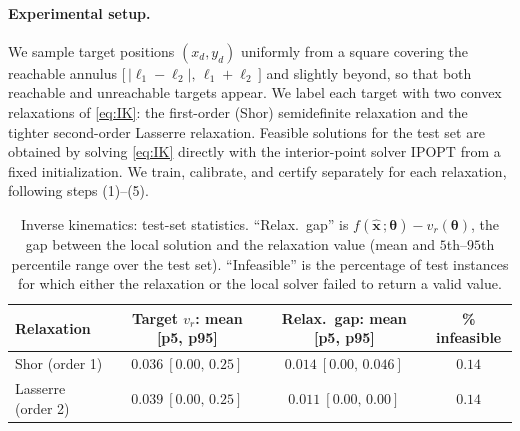 \documentclass[10pt]{article} %
\theoremstyle{plain}
\theoremstyle{definition}
\theoremstyle{remark}
\begin{document}
\paragraph{Experimental setup.} We sample target positions $(x_d, y_d)$ uniformly from a square covering the reachable annulus $\big[\,|\ell_1 - \ell_2|,\, \ell_1 + \ell_2\,\big]$ and slightly beyond, so that both reachable and unreachable targets appear. We label each target with two convex relaxations of \eqref{eq:IK}: the first-order (Shor) semidefinite relaxation and the tighter second-order Lasserre relaxation. Feasible solutions for the test set are obtained by solving \eqref{eq:IK} directly with the interior-point solver IPOPT from a fixed initialization. We train, calibrate, and certify separately for each relaxation, following steps (1)--(5).

\begin{table}[H]
\centering
\caption{Inverse kinematics: test-set statistics. ``Relax.\ gap'' is $f(\hat{\mathbf{x}}\,;\bm{\theta}) - v_r(\bm{\theta})$, the gap between the local solution and the relaxation value (mean and $5$th--$95$th percentile range over the test set). ``Infeasible'' is the percentage of test instances for which either the relaxation or the local solver failed to return a valid value.}
\begin{tabular}{lccc}
\toprule
\textbf{Relaxation} & \textbf{Target } $v_r$\textbf{: mean [p5, p95]} & \textbf{Relax.\ gap: mean [p5, p95]} & \textbf{\% infeasible} \\
\midrule
Shor (order 1)     & $0.036\ [0.00,\,0.25]$ & $0.014\ [0.00,\,0.046]$ & $0.14$ \\
Lasserre (order 2) & $0.039\ [0.00,\,0.25]$ & $0.011\ [0.00,\,0.00]$  & $0.14$ \\
\bottomrule
\end{tabular}
\label{tab:IK-data}
\end{table}
\end{document}
